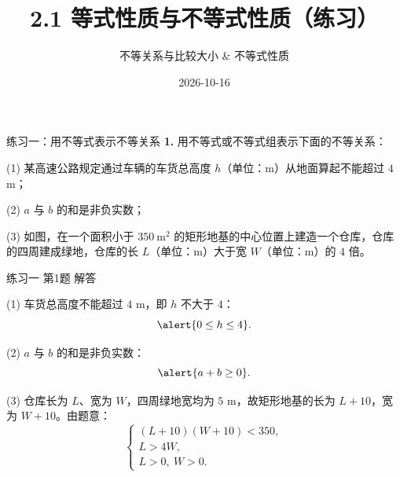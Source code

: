 \documentclass[10pt,aspectratio=169,serif]{beamer}
\title[2.1 等式性质与不等式性质·练习]{2.1 等式性质与不等式性质（练习）}
\subtitle{不等关系与比较大小 \& 不等式性质}
\author{}
\institute{}
\date{2026-10-16}
\begin{document}
\begin{frame}
  \titlepage
\end{frame}

\begin{frame}[t]{练习一：用不等式表示不等关系}
\textbf{1.} 用不等式或不等式组表示下面的不等关系：

\vspace{0.5em}
(1) 某高速公路规定通过车辆的车货总高度 $h$（单位：m）从地面算起不能超过 $4$ m；

(2) $a$ 与 $b$ 的和是非负实数；

(3) 如图，在一个面积小于 $350\ \mathrm{m^2}$ 的矩形地基的中心位置上建造一个仓库，仓库的四周建成绿地，仓库的长 $L$（单位：m）大于宽 $W$（单位：m）的 $4$ 倍。

\vspace{0.3em}
\begin{center}
\end{center}
\end{frame}

\begin{frame}[t]{练习一 第1题 解答}
\begin{tcolorbox}[colback=orange!10,colframe=orange,title=\textbf{解}]
(1) 车货总高度不能超过 $4$ m，即 $h$ 不大于 $4$：
\[
\alert{0 \le h \le 4}.
\]

\vspace{0.5em}
(2) $a$ 与 $b$ 的和是非负实数：
\[
\alert{a + b \ge 0}.
\]

\vspace{0.5em}
(3) 仓库长为 $L$、宽为 $W$，四周绿地宽均为 $5$ m，故矩形地基的长为 $L+10$，宽为 $W+10$。由题意：
\[
\begin{cases}
(L+10)(W+10) < 350,\\[2pt]
L > 4W,\\[2pt]
L > 0,\ W > 0.
\end{cases}
\]
\end{tcolorbox}
\end{frame}
\end{document}
